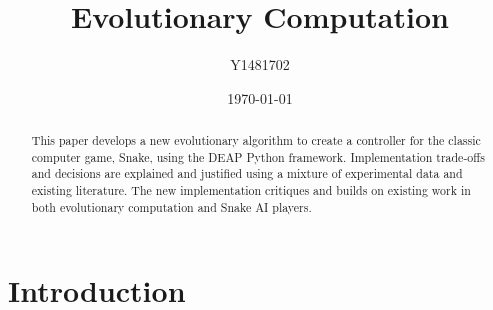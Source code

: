 \documentclass[12pt]{article}
\title{Evolutionary Computation}
\author{Y1481702}
\date{\today}
\begin{document}

\begin{titlingpage}
\clearpage\maketitle
\thispagestyle{empty}
\tableofcontents
\newpage
\vspace*{\fill}
\begin{abstract}
This paper develops a new evolutionary algorithm to create a controller for the classic computer game, Snake, using the DEAP Python framework. Implementation trade-offs and decisions are explained and justified using a mixture of experimental data and existing literature. The new implementation critiques and builds on existing work in both evolutionary computation and Snake AI players.
\end{abstract}
\vspace*{\fill}
\end{titlingpage}


\section{Introduction}
\end{document}
